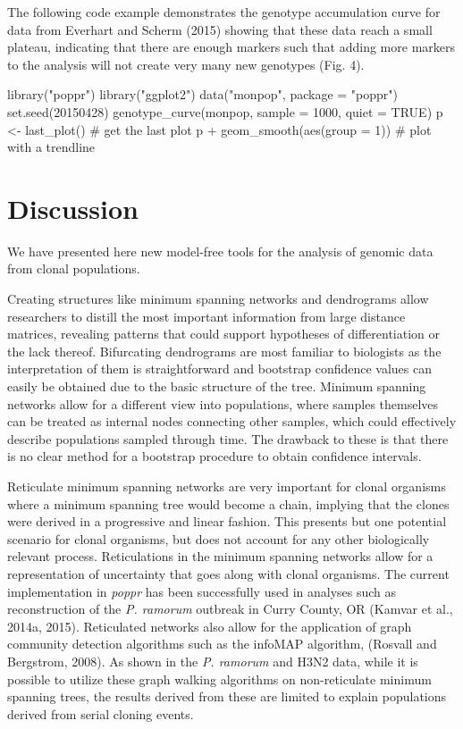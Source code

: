 \documentclass{frontiersSCNS} %
\newenvironment{CodeChunk}{}{}
\begin{document}
The following code example demonstrates the genotype accumulation curve
for data from Everhart and Scherm (2015) showing that these data reach a
small plateau, indicating that there are enough markers such that adding
more markers to the analysis will not create very many new genotypes
(Fig. 4).

\begin{CodeChunk}
\begin{CodeInput}
library("poppr")
library("ggplot2")
data("monpop", package = "poppr")
set.seed(20150428)
genotype_curve(monpop, sample = 1000, quiet = TRUE)
p <- last_plot()                # get the last plot
p + geom_smooth(aes(group = 1)) # plot with a trendline
\end{CodeInput}
\end{CodeChunk}

\section*{Discussion}\label{discussion}

We have presented here new model-free tools for the analysis of genomic
data from clonal populations.

Creating structures like minimum spanning networks and dendrograms allow
researchers to distill the most important information from large
distance matrices, revealing patterns that could support hypotheses of
differentiation or the lack thereof. Bifurcating dendrograms are most
familiar to biologists as the interpretation of them is straightforward
and bootstrap confidence values can easily be obtained due to the basic
structure of the tree. Minimum spanning networks allow for a different
view into populations, where samples themselves can be treated as
internal nodes connecting other samples, which could effectively
describe populations sampled through time. The drawback to these is that
there is no clear method for a bootstrap procedure to obtain confidence
intervals.

Reticulate minimum spanning networks are very important for clonal
organisms where a minimum spanning tree would become a chain, implying
that the clones were derived in a progressive and linear fashion. This
presents but one potential scenario for clonal organisms, but does not
account for any other biologically relevant process. Reticulations in
the minimum spanning networks allow for a representation of uncertainty
that goes along with clonal organisms. The current implementation in
\emph{poppr} has been successfully used in analyses such as
reconstruction of the \emph{P. ramorum} outbreak in Curry County, OR
(Kamvar et al., 2014a, 2015). Reticulated networks also allow for the
application of graph community detection algorithms such as the infoMAP
algorithm, (Rosvall and Bergstrom, 2008). As shown in the \emph{P.
ramorum} and H3N2 data, while it is possible to utilize these graph
walking algorithms on non-reticulate minimum spanning trees, the results
derived from these are limited to explain populations derived from
serial cloning events.
\end{document}
